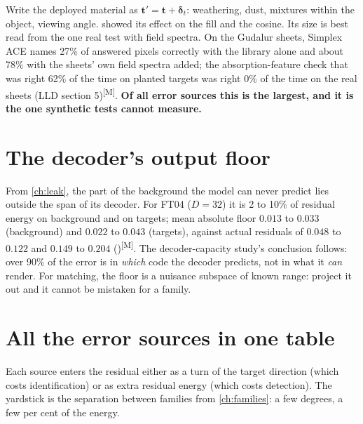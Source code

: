 \documentclass[11pt,a4paper,oneside,openany]{book}
\newcommand{\B}[1]{{\symbf{#1}}}
\newcommand{\B}[1]{{\bm{#1}}}
\newcommand{\meas}{\textsuperscript{\textsf{\scriptsize[M]}}}
\newcommand{\vt}{\B{t}}
\newcommand{\vdelta}{\B{\delta}}
\begin{document}
Write the deployed material as $\vt'=\vt+\vdelta_t$: weathering, dust, mixtures within the object, viewing angle.  showed its effect on the fill and the
cosine. Its size is best read from the one real test with field spectra. On the Gudalur sheets, Simplex ACE names 27\% of answered pixels correctly with the library
alone and about 78\% with the sheets' own field spectra added; the absorption-feature check that was right 62\% of the time on planted targets was right 0\% of the time
on the real sheets (LLD section 5)\meas. \textbf{Of all error sources this is the largest, and it is the one synthetic tests cannot measure.}

\section{The decoder's output floor}

From \cref{ch:leak}, the part of the background the model can never predict lies outside the span of its decoder. For FT04 ($D=32$) it is 2 to 10\% of residual energy on
background and on targets; mean absolute floor $0.013$ to $0.033$ (background) and $0.022$ to $0.043$ (targets), against actual residuals of $0.048$ to $0.122$ and $0.149$
to $0.204$ ()\meas. The decoder-capacity study's conclusion follows: over 90\% of the error is in \emph{which} code the decoder predicts, not in
what it \emph{can} render. For matching, the floor is a nuisance subspace of known range: project it out and it cannot be mistaken for a family.

\section{All the error sources in one table}

Each source enters the residual either as a turn of the target direction (which costs identification) or as extra residual energy (which costs detection). The yardstick
is the separation between families from \cref{ch:families}: a few degrees, a few per cent of the energy.
\end{document}
